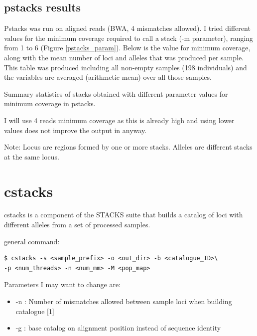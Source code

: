 \documentclass[10pt,a4paper]{report}
\begin{document}
\subsection{pstacks results}

Pstacks was run on aligned reads (BWA, 4 mismatches allowed). I tried different values for the minimum coverage required to call a stack (-m parameter), ranging from 1 to 6 (Figure \ref{pstacks_param}). Below is the value for minimum coverage, along with the mean number of loci and alleles that was produced per sample. This table was produced including all non-empty samples (198 individuals) and the variables are averaged (arithmetic mean) over all those samples.

\begin{table}
\begin{center}
\vspace{10px}
\vspace{10px}
\caption{Summary statistics of stacks obtained with different parameter values for minimum coverage in pstacks.}
\label{pstacks_param}
\end{center}
\end{table}

I will use 4 reads minimum coverage as this is already high and using lower values does not improve the output in anyway.

Note: Locus are regions formed by one or more stacks. Alleles are different stacks at the same locus.

\section{cstacks}

cstacks is a component of the STACKS suite that builds a catalog of loci with different alleles from a set of processed samples.

general command: 
\begin{lstlisting}
$ cstacks -s <sample_prefix> -o <out_dir> -b <catalogue_ID>\
-p <num_threads> -n <num_mm> -M <pop_map>
\end{lstlisting}

Parameters I may want to change are: 
\begin{itemize}
\item -n : Number of mismatches allowed between sample loci when building catalogue [1]
\item -g : base catalog on alignment position instead of sequence identity
\end{itemize}
\end{document}
